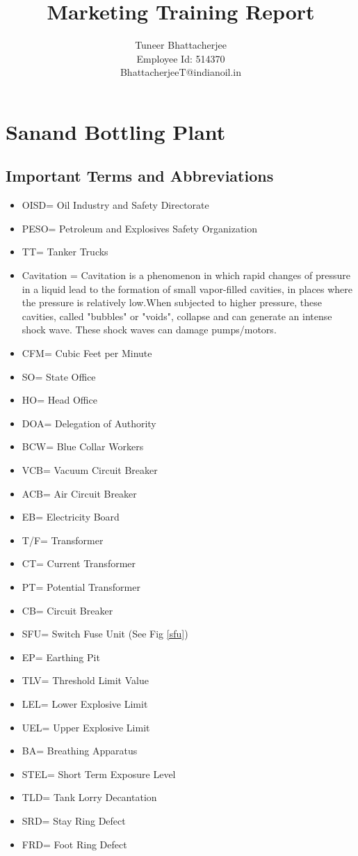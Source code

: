 \documentclass{report}
\title{Marketing Training Report}
\author{Tuneer Bhattacherjee\\Employee Id: 514370\\BhattacherjeeT@indianoil.in}
\date{}
\begin{document}
	\maketitle
	\pagebreak
	\tableofcontents
	\pagebreak
	\listoffigures
	\pagebreak
	\listoftables
	\chapter{Sanand Bottling Plant}
	\section{Important Terms and Abbreviations}
	\begin{itemize}
		\item OISD= Oil Industry and Safety Directorate
		\item PESO= Petroleum and Explosives Safety Organization
		\item TT= Tanker Trucks
		\item Cavitation = Cavitation is a phenomenon in which rapid changes of pressure in a liquid lead to the formation of small vapor-filled cavities, in places where the pressure is relatively low.When subjected to higher pressure, these cavities, called "bubbles" or "voids", collapse and can generate an intense shock wave. These shock waves can damage pumps/motors.
		\item CFM= Cubic Feet per Minute
		\item SO= State Office
		\item HO= Head Office
		\item DOA= Delegation of Authority
		\item BCW= Blue Collar Workers
		\item VCB= Vacuum Circuit Breaker
		\item ACB= Air Circuit Breaker
		\item EB= Electricity Board
		\item T/F= Transformer
		\item CT= Current Transformer
		\item PT= Potential Transformer
		\item CB= Circuit Breaker
		\item SFU= Switch Fuse Unit (See Fig \ref{sfu})
		\item EP= Earthing Pit
		\item TLV= Threshold Limit Value
		\item LEL= Lower Explosive Limit
		\item UEL= Upper Explosive Limit
		\item BA= Breathing Apparatus
		\item STEL= Short Term Exposure Level
		\item TLD= Tank Lorry Decantation
		\item SRD= Stay Ring Defect
		\item FRD= Foot Ring Defect
	\end{itemize}
\end{document}
